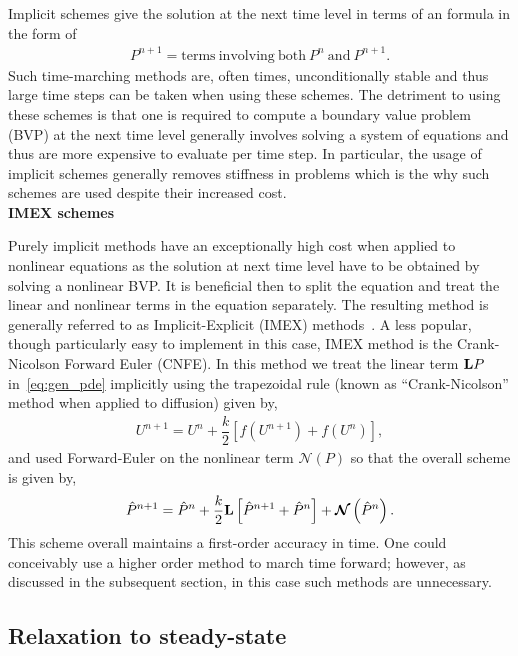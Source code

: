 \documentclass[11pt]{article}
\newcommand{\Phat}{\hat{P}}
\newcommand{\mN}{\bm{\mathcal{N}}}
\begin{document}
Implicit schemes give the solution at the next time level in terms of an  formula in the form of
\begin{align*}
    P^{n+1} = \mathrm{terms\ involving\ both\ }P^{n}\ \mathrm{and}\ P^{n+1}.
\end{align*}
Such time-marching methods are, often times, unconditionally stable and thus large time steps can be taken when using these schemes. The detriment to using these schemes is that one is required to compute a boundary value problem (BVP) at the next time level generally involves solving a system of equations and thus are more expensive to evaluate per time step. In particular, the usage of implicit schemes generally removes stiffness in problems which is the why such schemes are used despite their increased cost. \\
\newpage
\noindent\textbf{IMEX schemes}

Purely implicit methods have an exceptionally high cost when applied to nonlinear equations as the solution at next time level have to be obtained by solving a nonlinear BVP. It is beneficial then to split the equation and treat the linear and nonlinear terms in the equation separately. The resulting method is generally referred to as Implicit-Explicit (IMEX) methods~\cite{ascher1995}. A less popular, though particularly easy to implement in this case, IMEX method is the Crank-Nicolson Forward Euler (CNFE). In this method we treat the linear term $\vb{L}P$ in~\eqref{eq:gen_pde} implicitly using the trapezoidal rule (known as ``Crank-Nicolson'' method when applied to diffusion) given by,
\begin{align}
    U^{n+1} = U^{n} + \dfrac{k}{2}\left[f(U^{n+1}) + f(U^{n})\right],
\end{align}
and used Forward-Euler on the nonlinear term $\mN(P)$ so that the overall scheme is given by,
\begin{align}
    \Phat^{n+1} = \Phat^{n} + \dfrac{k}{2}\vb{L}\left[\Phat^{n+1}+\Phat^{n}\right] + \mN\left(\Phat^{n}\right). \label{eq:trapz_euler}
\end{align}
This scheme overall maintains a first-order accuracy in time. One could conceivably use a higher order method to march time forward; however, as discussed in the subsequent section, in this case such methods are unnecessary.

\subsection{Relaxation to steady-state}
\end{document}
